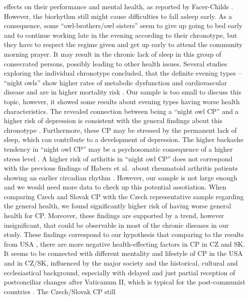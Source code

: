 \documentclass[ijerph,article,accept,moreauthors,pdftex]{mdpi}
\begin{document}
effects on their performance and mental health, as reported by
Facer-Childs \citep{facer2019resetting}. However, the biorhythm still
might cause difficulties to fall asleep early. As a consequence, some
``owl-brothers/owl sisters'' seem to give up going to bed early and to
continue working late in the evening according to their chronotype, but
they have to respect the regime given and get up early to attend the
community morning prayer. It may result in the chronic lack of sleep in
this group of consecrated persons, possibly leading to other health
issues. Several studies exploring the individual chronotype concluded,
that the definite evening types -- ``night owls'' show higher rates of
metabolic dysfunction and cardiovascular disease and are in higher
mortality risk \citep{knutson2018associations}. Our sample is too small
to discuss this topic, however, it showed some results about evening
types having worse health characteristics. The revealed connection
between being a ``night owl CP'' and a higher risk of depression is
consistent with the general findings about this chronotype
\citep{facer2019resetting}. Furthermore, these CP may be stressed by the
permanent lack of sleep, which can contribute to a development of
depression. The higher backache tendency in ``night owl CP'' may be a
psychosomatic consequence of a higher stress level
\citep{hajnovic2018causal}. A higher risk of arthritis in ``night owl
CP'' does not correspond with the previous findings of Habers et
al.~about rheumatoid arthritis patients showing an earlier circadian
rhythm \citep{habers2021earlier}. However, our sample is not large
enough and we would need more data to check up this potential
assotiation. When comparing Czech and Slovak CP with the Czech
representative sample regarding the general health, we found
significantly higher risk of having worse general health for CP.
Moreover, these findings are supported by a trend, however
insignificant, that could be observable in most of the chronic diseases
in our study. These findings correspond to our hypothesis that comparing
to the results from USA
\citep{schott2019stability, weinstein2019autonomous}, there are more
negative health-effecting factors in CP in CZ and SK. It seems to be
connected with different mentality and lifestyle of CP in the USA and in
CZ/SK, influenced by the major society and the historical, cultural and
ecclesiastical background, especially with delayed and just partial
reception of postconciliar changes after Vaticanum II, which is typical
for the post-communist countries
\citep{fiala2000koncil, balik2012letnice}. The Czech/Slovak CP still
\end{document}
